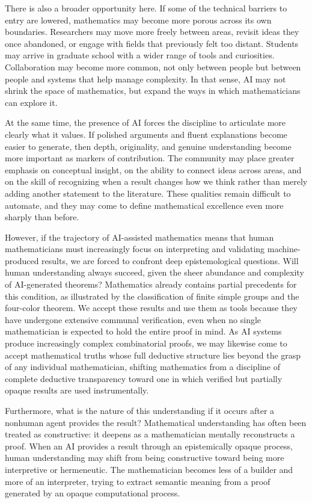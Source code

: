 \documentclass[12pt]{article}
\begin{document}
There is also a broader opportunity here. If some of the technical barriers to entry are lowered, mathematics may become more porous across its own boundaries. Researchers may move more freely between areas, revisit ideas they once abandoned, or engage with fields that previously felt too distant. Students may arrive in graduate school with a wider range of tools and curiosities. Collaboration may become more common, not only between people but between people and systems that help manage complexity. In that sense, AI may not shrink the space of mathematics, but expand the ways in which mathematicians can explore it.

At the same time, the presence of AI forces the discipline to articulate more clearly what it values. If polished arguments and fluent explanations become easier to generate, then depth, originality, and genuine understanding become more important as markers of contribution. The community may place greater emphasis on conceptual insight, on the ability to connect ideas across areas, and on the skill of recognizing when a result changes how we think rather than merely adding another statement to the literature. These qualities remain difficult to automate, and they may come to define mathematical excellence even more sharply than before.

However, if the trajectory of AI-assisted mathematics means that human mathematicians must increasingly focus on interpreting and validating machine-produced results, we are forced to confront deep epistemological questions. Will human understanding always succeed, given the sheer abundance and complexity of AI-generated theorems? Mathematics already contains partial precedents for this condition, as illustrated by the classification of finite simple groups and the four-color theorem. We accept these results and use them as tools because they have undergone extensive communal verification, even when no single mathematician is expected to hold the entire proof in mind. As AI systems produce increasingly complex combinatorial proofs, we may likewise come to accept mathematical truths whose full deductive structure lies beyond the grasp of any individual mathematician, shifting mathematics from a discipline of complete deductive transparency toward one in which verified but partially opaque results are used instrumentally.

Furthermore, what is the nature of this understanding if it occurs after a nonhuman agent provides the result? Mathematical understanding has often been treated as constructive: it deepens as a mathematician mentally reconstructs a proof. When an AI provides a result through an epistemically opaque process, human understanding may shift from being constructive toward being more interpretive or hermeneutic. The mathematician becomes less of a builder and more of an interpreter, trying to extract semantic meaning from a proof generated by an opaque computational process.
\end{document}
